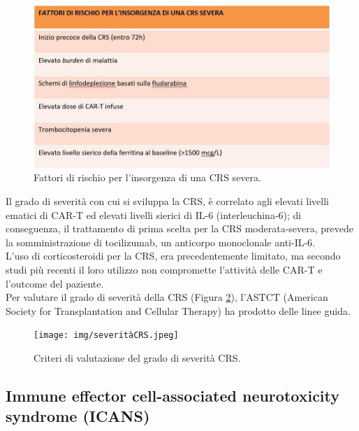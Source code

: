 \begin{figure}[H]
    \begin{center}
    \vspace{-3mm}
    \includegraphics[width=0.7\columnwidth]{img/rischioCRS.jpeg}
    \end{center}
    \caption{Fattori di rischio per l’insorgenza di una CRS severa. 
    \cite{EMATOCART}}
    \label{fig:FIGURE_3.11}
\end{figure}

Il grado di severità con cui si sviluppa la CRS, è correlato agli elevati livelli ematici di CAR-T ed elevati livelli 
sierici di IL-6 (interleuchina-6); di conseguenza, il trattamento di prima scelta per la CRS moderata-severa, 
prevede la somministrazione di tocilizumab, un anticorpo monoclonale anti-IL-6\cite{EMATOCART}.\\
L’uso di corticosteroidi per la CRS, era precedentemente limitato, ma secondo studi più recenti il loro utilizzo 
non compromette l'attività delle CAR-T e l’outcome del paziente\cite{Cortico}.\\
Per valutare il grado di severità della CRS (Figura \ref{fig:FIGURE_5.4}), l’ASTCT (American Society for Transplantation 
and Cellular Therapy) ha prodotto delle linee guida\cite{LEE2019625}.

\begin{figure}[H]
    \begin{center}
    \vspace{-3mm}
    \texttt{[image: img/severitàCRS.jpeg]}
    \end{center}
    \caption{Criteri di valutazione del grado di severità CRS.
    \cite{EMATOCART}}
    \label{fig:FIGURE_5.4}
\end{figure}

\subsection{Immune effector cell-associated neurotoxicity syndrome (ICANS)}

